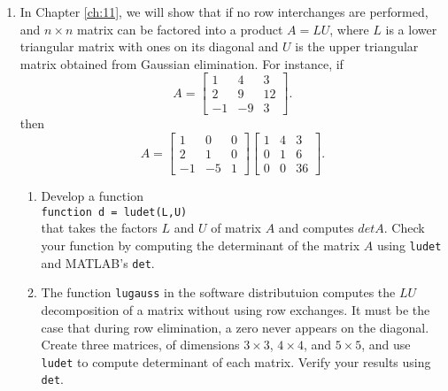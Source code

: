 \documentclass[../main.tex]{subfiles}
\begin{document}
\begin{enumerate}[label=\textbf{\thechapter.\arabic{*}}, resume ]
  \item \label{pr:4_29} In Chapter \ref{ch:11}, we will show that if no row interchanges are performed, and \(n \times n\) matrix can be factored into a product \(A = LU\), where \(L\) is a lower triangular matrix with ones on its diagonal and \(U\) is the upper triangular matrix obtained from Gaussian elimination. For instance, if
  \begin{equation*}
    A =\begin{bmatrix}
      1 & 4 & 3\\
      2 & 9 & 12\\
      -1 & -9 & 3
    \end{bmatrix}.
  \end{equation*}
  then
  \begin{equation*}
    A =\begin{bmatrix}
      1 & 0 & 0\\
      2 & 1 & 0\\
      -1 & -5 & 1
    \end{bmatrix}
    \begin{bmatrix}
      1 & 4 & 3\\
      0 & 1 & 6\\
      0 & 0 & 36
    \end{bmatrix}.
  \end{equation*}
  \begin{enumerate}[leftmargin=*, label=\textbf{\alph{*}.}]
    \item Develop a function \\
    \texttt{function d = ludet(L,U)}\\
    that takes the factors \(L\) and \(U\) of matrix \(A\) and computes \(detA\). Check your function by computing the determinant of the matrix \(A\) using \texttt{ludet} and MATLAB's \texttt{det}.
    
    \item The function \texttt{lugauss} in the software distributuion computes the \(LU\) decomposition of a matrix without using row exchanges. It must be the case that during row elimination, a zero never appears on the diagonal. Create three matrices, of dimensions \(3 \times 3\), \(4 \times 4\), and \(5 \times 5\), and use \texttt{ludet} to compute determinant of each matrix. Verify your results using \texttt{det}.
  \end{enumerate}
  

\end{enumerate}
\end{document}
